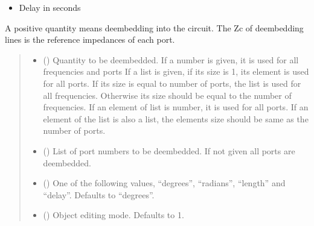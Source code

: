 \documentclass[letterpaper,10pt,english]{sphinxmanual}
\begin{document}
\begin{fulllineitems}
\begin{fulllineitems}
\begin{description}
\begin{itemize}
\item {}
\sphinxAtStartPar
Delay in seconds

\end{itemize}

\end{description}

\sphinxAtStartPar
A positive quantity means deembedding into the circuit.
The Zc of de\sphinxhyphen{}embedding lines is the reference impedances of each port.
\begin{quote}\begin{description}
\begin{itemize}
\item {}
\sphinxAtStartPar
{} () \textendash{} Quantity to be deembedded.
\sphinxhyphen{} If a number is given, it is used for all frequencies and ports
\sphinxhyphen{} If a list is given, if its size is 1, its element is used for all ports. If its size is equal to number of ports, the list is used for all frequencies.
Otherwise its size should be equal to the number of frequencies. If an element of list is number, it is used for all ports. If an element of the list is also a list, the elements size should be same as the number of ports.

\item {}
\sphinxAtStartPar
{} (\sphinxstyleliteralemphasis{\sphinxupquote{, }}) \textendash{} List of port numbers to be deembedded. If not given all ports are deembedded.

\item {}
\sphinxAtStartPar
{} (\sphinxstyleliteralemphasis{\sphinxupquote{, }}) \textendash{} One of the following values, “degrees”, “radians”, “length” and “delay”. Defaults to “degrees”.

\item {}
\sphinxAtStartPar
{} (\sphinxstyleliteralemphasis{\sphinxupquote{, }}) \textendash{} Object editing mode. Defaults to \sphinxhyphen{}1.


\end{itemize}
\end{description}
\end{quote}
\end{fulllineitems}
\end{fulllineitems}
\end{document}
